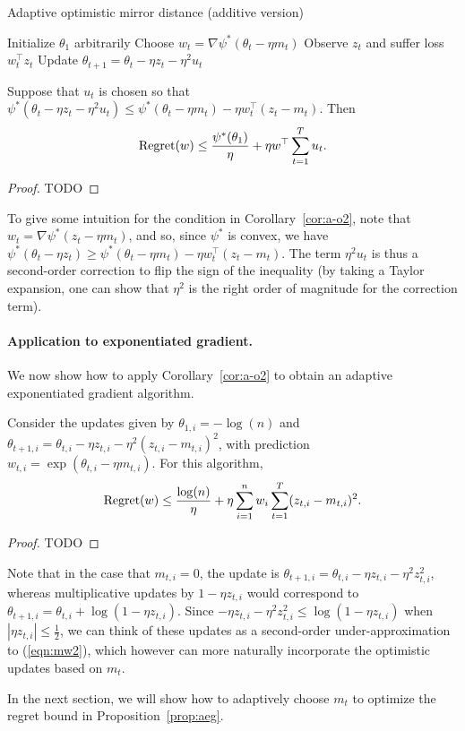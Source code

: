 \documentclass[paper_icml.tex]{subfiles}
\begin{document}
\begin{algorithm}
\caption{Adaptive optimistic mirror distance (additive version)}
\label{alg:a-o2}

\begin{algorithmic}
\STATE Initialize $\theta_1$ arbitrarily
  \STATE Choose $w_t = \nabla \psi^*(\theta_t - \eta m_t)$
  \STATE Observe $z_t$ and suffer loss $w_t^{\top}z_t$
  \STATE Update $\theta_{t+1} = \theta_t - \eta z_t - \eta^2 u_t$
\ENDFOR
\end{algorithmic}
\end{algorithm}

\begin{corollary}
\label{cor:a-o2}
Suppose that $u_t$ is chosen so that $\psi^*(\theta_t - \eta z_t - \eta^2 u_t) \leq \psi^*(\theta_t - \eta m_t) - \eta w_t^{\top}(z_t - m_t)$. 
Then 
\begin{equation}
\operatorname{Regret}(w) \leq \frac{\psi^*(\theta_1)}{\eta} + \eta w^{\top} \sum_{t=1}^T u_t.
\end{equation}
\end{corollary}
\begin{proof}
TODO
\end{proof}
To give some intuition for the condition in Corollary~\ref{cor:a-o2}, note that 
$w_t = \nabla \psi^*(z_t - \eta m_t)$, and so, since $\psi^*$ is convex, we have
$\psi^*(\theta_t - \eta z_t) \geq \psi^*(\theta_t - \eta m_t) - \eta w_t^{\top}(z_t - m_t)$. 
The term $\eta^2 u_t$ is thus a second-order correction to flip the sign of the inequality 
(by taking a Taylor expansion, one can show that $\eta^2$ is the right order of magnitude for 
the correction term). 

\paragraph{Application to exponentiated gradient.} We now show how to apply 
Corollary~\ref{cor:a-o2} to obtain an adaptive exponentiated gradient algorithm.
\begin{proposition}
\label{prop:aeg}
Consider the updates given by $\theta_{1,i} = -\log(n)$ and 
$\theta_{t+1,i} = \theta_{t,i} - \eta z_{t,i} - \eta^2 (z_{t,i} - m_{t,i})^2$, 
with prediction $w_{t,i} = \exp(\theta_{t,i} - \eta m_{t,i})$. For this 
algorithm,
\begin{equation}
\operatorname{Regret}(w) \leq \frac{\log(n)}{\eta} + \eta \sum_{i=1}^n w_i \sum_{t=1}^T (z_{t,i} - m_{t,i})^2.
\end{equation}
\end{proposition}
\begin{proof}
TODO
\end{proof}
Note that in the case that $m_{t,i} = 0$, the update is 
$\theta_{t+1,i} = \theta_{t,i} - \eta z_{t,i} - \eta^2 z_{t,i}^2$, whereas multiplicative 
updates by $1 - \eta z_{t,i}$ would correspond to 
$\theta_{t+1,i} = \theta_{t,i} + \log(1 - \eta z_{t,i})$. Since 
$-\eta z_{t,i} - \eta^2 z_{t,i}^2 \leq \log(1 - \eta z_{t,i})$ when 
$|\eta z_{t,i}| \leq \frac{1}{2}$, we can think of these updates as a second-order 
under-approximation to (\ref{eqn:mw2}), which however can more naturally incorporate 
the optimistic updates based on $m_t$.

In the next section, we will show how to adaptively choose $m_t$ to optimize the regret bound 
in Proposition~\ref{prop:aeg}.
\end{document}
